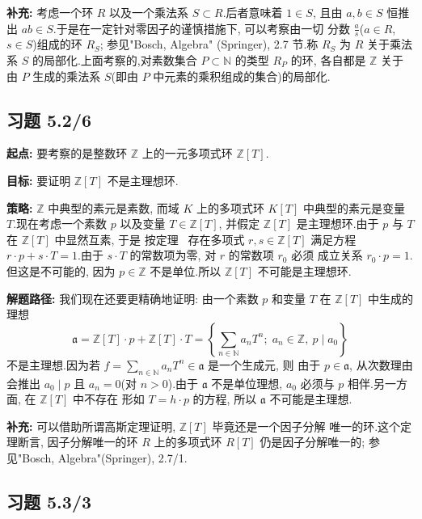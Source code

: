 \noindent\textbf{补充:} 考虑一个环 $R$ 以及一个乘法系 $S \subset R$.后者意味着 $1 \in S$,
且由 $a, b \in S$ 恒推出 $ab \in S$.于是在一定针对零因子的谨慎措施下, 可以考察由一切
分数 $\frac{a}{s}$($a \in R$, $s \in S$)组成的环 $R_S$; 参见"Bosch, Algebra"
(Springer), 2.7 节.称 $R_S$ 为 $R$ 关于乘法系 $S$ 的局部化.上面考察的,对素数集合
$P \subset \mathbb{N}$ 的类型 $R_P$ 的环, 各自都是 $\mathbb{Z}$ 关于由 $P$ 生成的乘法系
$S$(即由 $P$ 中元素的乘积组成的集合)的局部化.

\subsection*{习题 5.2/6}

\noindent\textbf{起点:} 要考察的是整数环 $\mathbb{Z}$ 上的一元多项式环 $\mathbb{Z}[T]$.

\noindent\textbf{目标:} 要证明 $\mathbb{Z}[T]$ 不是主理想环.

\noindent\textbf{策略:} $\mathbb{Z}$ 中典型的素元是素数, 而域 $K$ 上的多项式环
$K[T]$ 中典型的素元是变量 $T$.现在考虑一个素数 $p$ 以及变量 $T \in \mathbb{Z}[T]$,
并假定 $\mathbb{Z}[T]$ 是主理想环.由于 $p$ 与 $T$ 在 $\mathbb{Z}[T]$ 中显然互素, 于是
按定理~ 存在多项式 $r, s \in \mathbb{Z}[T]$ 满足方程
$r \cdot p + s \cdot T = 1$.由于 $s \cdot T$ 的常数项为零, 对 $r$ 的常数项 $r_0$ 必须
成立关系 $r_0 \cdot p = 1$.但这是不可能的, 因为 $p \in \mathbb{Z}$ 不是单位.所以
$\mathbb{Z}[T]$ 不可能是主理想环.

\noindent\textbf{解题路径:} 我们现在还要更精确地证明: 由一个素数 $p$ 和变量 $T$ 在
$\mathbb{Z}[T]$ 中生成的理想
\[
\mathfrak{a} = \mathbb{Z}[T] \cdot p + \mathbb{Z}[T] \cdot T = \left\{ \sum_{n \in \mathbb{N}} a_n T^n;\; a_n \in \mathbb{Z}, \ p \mid a_0 \right\}
\]
不是主理想.因为若 $f = \sum_{n \in \mathbb{N}} a_n T^n \in \mathfrak{a}$ 是一个生成元, 则
由于 $p \in \mathfrak{a}$, 从次数理由会推出 $a_0 \mid p$ 且 $a_n = 0$(对 $n > 0$).由于
$\mathfrak{a}$ 不是单位理想, $a_0$ 必须与 $p$ 相伴.另一方面, 在 $\mathbb{Z}[T]$ 中不存在
形如 $T = h \cdot p$ 的方程, 所以 $\mathfrak{a}$ 不可能是主理想.

\noindent\textbf{补充:} 可以借助所谓高斯定理证明, $\mathbb{Z}[T]$ 毕竟还是一个因子分解
唯一的环.这个定理断言, 因子分解唯一的环 $R$ 上的多项式环 $R[T]$ 仍是因子分解唯一的;
参见"Bosch, Algebra"(Springer), 2.7/1.

\subsection*{习题 5.3/3}

